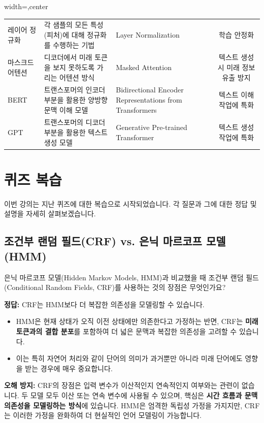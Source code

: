 \documentclass[11pt,a4paper]{article}
\begin{document}
\begin{adjustbox}{width=\textwidth,center}
\begin{tabular}{lllc}
레이어 정규화 & 각 샘플의 모든 특성(피처)에 대해 정규화를 수행하는 기법 & Layer Normalization & 학습 안정화 \\
마스크드 어텐션 & 디코더에서 미래 토큰을 보지 못하도록 가리는 어텐션 방식 & Masked Attention & 텍스트 생성 시 미래 정보 유출 방지 \\
BERT & 트랜스포머의 인코더 부분을 활용한 양방향 문맥 이해 모델 & Bidirectional Encoder Representations from Transformers & 텍스트 이해 작업에 특화 \\
GPT & 트랜스포머의 디코더 부분을 활용한 텍스트 생성 모델 & Generative Pre-trained Transformer & 텍스트 생성 작업에 특화 \\
\bottomrule
\end{tabular}
\end{adjustbox}

\newpage
\section{퀴즈 복습}
이번 강의는 지난 퀴즈에 대한 복습으로 시작되었습니다. 각 질문과 그에 대한 정답 및 설명을 자세히 살펴보겠습니다.

\subsection{조건부 랜덤 필드(CRF) vs. 은닉 마르코프 모델(HMM)}
\begin{conceptbox}[title={질문 1: CRF의 장점}]
은닉 마르코프 모델(Hidden Markov Models, HMM)과 비교했을 때 조건부 랜덤 필드(Conditional Random Fields, CRF)를 사용하는 것의 장점은 무엇인가요?
\end{conceptbox}

\begin{summarybox}[title={정답 및 설명}]
\textbf{정답:} CRF는 HMM보다 더 복잡한 의존성을 모델링할 수 있습니다.
\begin{itemize}
    \item HMM은 현재 상태가 오직 이전 상태에만 의존한다고 가정하는 반면, CRF는 \textbf{미래 토큰과의 결합 분포}를 포함하여 더 넓은 문맥과 복잡한 의존성을 고려할 수 있습니다.
    \item 이는 특히 자연어 처리와 같이 단어의 의미가 과거뿐만 아니라 미래 단어에도 영향을 받는 경우에 매우 중요합니다.
\end{itemize}
\textbf{오해 방지:} CRF의 장점은 입력 변수가 이산적인지 연속적인지 여부와는 관련이 없습니다. 두 모델 모두 이산 또는 연속 변수에 사용될 수 있으며, 핵심은 \textbf{시간 흐름과 문맥 의존성을 모델링하는 방식}에 있습니다. HMM은 엄격한 독립성 가정을 가지지만, CRF는 이러한 가정을 완화하여 더 현실적인 언어 모델링이 가능합니다.
\end{summarybox}
\end{document}
